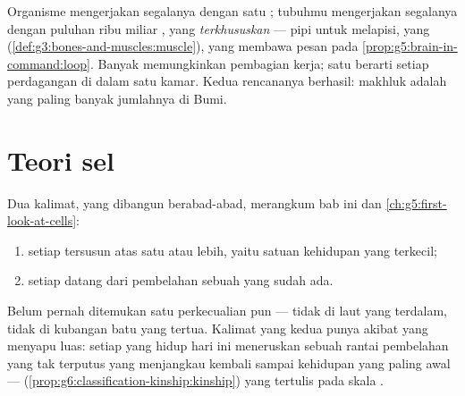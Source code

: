\begin{remark}\label{rem:g6:cell-unit-of-life:twoways}
Organisme  mengerjakan segalanya dengan satu ;
tubuhmu mengerjakan segalanya dengan puluhan ribu miliar , yang
\emph{terkhususkan} ---  pipi untuk melapisi,   yang
 (\cref{def:g3:bones-and-muscles:muscle}),   yang
membawa pesan pada \cref{prop:g5:brain-in-command:loop}. Banyak 
memungkinkan pembagian kerja; satu  berarti setiap perdagangan di
dalam satu kamar. Kedua rencananya berhasil: makhluk 
adalah  yang paling banyak jumlahnya di Bumi.
\end{remark}

\section{Teori sel}

\begin{proposition}\label{prop:g6:cell-unit-of-life:theory}
Dua kalimat, yang dibangun berabad-abad, merangkum bab ini dan
\cref{ch:g5:first-look-at-cells}:
\begin{enumerate}
  \item setiap  tersusun atas satu  atau lebih, yaitu
        satuan kehidupan yang terkecil;
  \item setiap  datang dari pembelahan sebuah  yang sudah ada.
\end{enumerate}
Belum pernah ditemukan satu perkecualian pun --- tidak di laut yang
terdalam, tidak di kubangan batu yang tertua. Kalimat yang kedua punya
akibat yang menyapu luas: setiap  yang hidup hari ini meneruskan
sebuah rantai pembelahan yang tak terputus yang menjangkau kembali
sampai kehidupan yang paling awal --- 
(\cref{prop:g6:classification-kinship:kinship}) yang tertulis pada
skala .
\end{proposition}
\admitted

